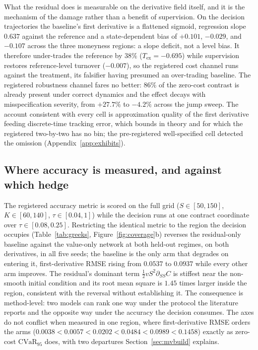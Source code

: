 \documentclass{article}
\begin{document}
What the residual does is measurable on the derivative field itself, and it is the
mechanism of the damage rather than a benefit of supervision. On the decision
trajectories the baseline's first derivative is a flattened sigmoid, regression slope
$0.637$ against the reference and a state-dependent bias of $+0.101$, $-0.029$, and
$-0.107$ across the three moneyness regions: a slope deficit, not a level bias. It
therefore under-trades the reference by $38\%$ ($T_{\mathrm{ex}} = -0.695$) while
supervision restores reference-level turnover ($-0.007$), so the registered cost
channel runs against the treatment, its falsifier having presumed an over-trading
baseline. The registered robustness channel fares no better: $86\%$ of the zero-cost contrast
is already present under correct dynamics and the effect decays with misspecification
severity, from $+27.7\%$ to $-4.2\%$ across the jump sweep. The account consistent
with every cell is approximation quality of the first derivative feeding
discrete-time tracking error, which \citet{noguer2026derivative} bounds in theory
and for which the registered two-by-two has no bin; the pre-registered
well-specified cell detected the omission (Appendix~\ref{app:exhibits}).

\subsection{Where accuracy is measured, and against which hedge}
\label{sec:region}

The registered accuracy metric is scored on the full grid ($S \in [50,150]$,
$K \in [60,140]$, $\tau \in [0.04,1]$) while the decision runs at one contract
coordinate over $\tau \in [0.08, 0.25]$. Restricting the identical metric to the
region the decision occupies (Table~\ref{tab:greeks},
Figure~\ref{fig:coverage}b) reverses the residual-only baseline against the
value-only network at both held-out regimes, on both derivatives, in all five seeds;
the baseline is the only arm that degrades on entering it, first-derivative RMSE
rising from $0.0537$ to $0.0937$ while every other arm improves. The residual's
dominant term $\tfrac12 vS^{2}\partial_{SS}C$ is stiffest near the non-smooth
initial condition and its root mean square is $1.45$ times larger inside the region,
consistent with the reversal without establishing it. The consequence is
method-level: two models can rank one way under the protocol the literature reports
and the opposite way under the accuracy the decision consumes. The axes do not
conflict when measured in one region, where first-derivative RMSE orders the arms
($0.0038 < 0.0057 < 0.0202 < 0.0484 < 0.0989 < 0.1458$) exactly as zero-cost
$\mathrm{CVaR}_{95}$ does, with two departures Section~\ref{sec:mvbuild} explains.
\end{document}
